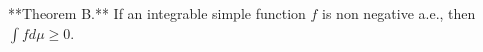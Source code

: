 **Theorem B.** If an integrable simple function $f$ is non negative a.e., then $\int f d\mu \geq 0$.

